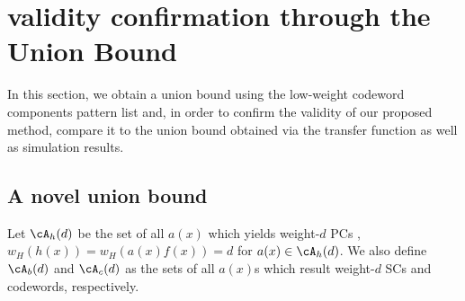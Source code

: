 \section{validity confirmation through the Union Bound}
\label{sec4}


 In this section, we obtain a union bound using the low-weight codeword components pattern list and,  in order to confirm the validity of our proposed method, compare it to the union bound obtained via the transfer function as well as simulation results.

\subsection{A novel union bound}
Let $\cA_h(d)$ be the set of all $a(x)$ which yields weight-$d$ PCs \ie, $w_H(h(x))=w_H(a(x)f(x))=d$ for $a(x) \in \cA_h(d)$. We also define $\cA_b(d)$ and $\cA_c(d)$ as the sets of all $a(x)$s which result weight-$d$ SCs and codewords, respectively.

